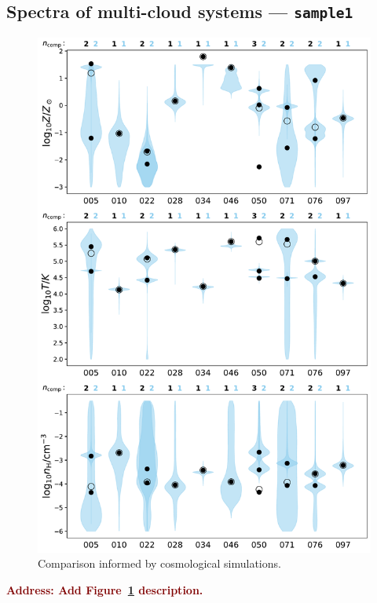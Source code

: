 \documentclass[fleqn,usenatbib]{mnras}
\newcommand{\todo}[1]{\textcolor{Maroon}{\textbf{Address: #1}}}
\begin{document}
\subsection{Spectra of multi-cloud systems --- \texttt{sample1}}
\label{s: results -- sample1}

\begin{figure}
    \centering
    \includegraphics[width=\columnwidth]{figures/sample1/comparison.pdf}
    \caption{
    Comparison informed by cosmological simulations.
    }
    \label{f: informed}
\end{figure}

\todo{Add Figure~\ref{f: informed} description.}
\end{document}
